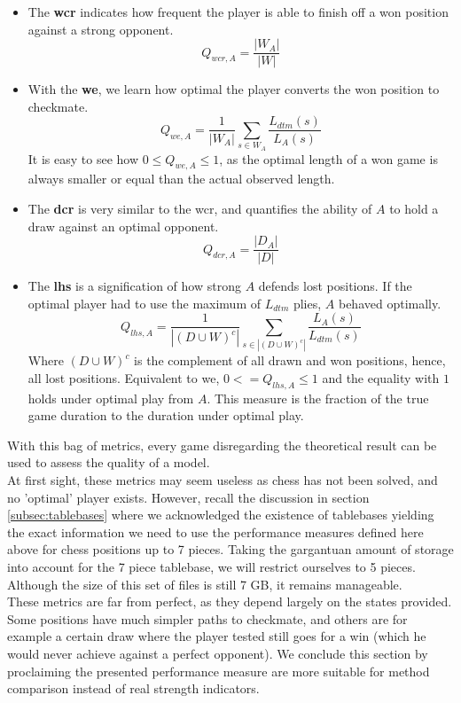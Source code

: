 \begin{itemize}
\item The \textbf{\gls{wcr}} indicates how frequent the player is able to finish off a won position against a strong opponent.
\[
Q_{wcr,A}=\frac{|W_A|}{|W|}
\] 
\item With the \textbf{\gls{we}}, we learn how optimal the player converts the won position to checkmate.
\[
Q_{we,A}=\frac{1}{|W_A|}\sum_{s\in W_A}\frac{L_{dtm}(s)}{L_A(s)}
\]
It is easy to see how $0\leq Q_{we,A}\leq1$, as the optimal length of a won game is always smaller or equal than the actual observed length.
\item The \textbf{\gls{dcr}} is very similar to the \gls{wcr}, and quantifies the ability of $A$ to hold a draw against an optimal opponent.
\[
Q_{dcr,A}=\frac{|D_A|}{|D|}
\]
\item The \textbf{\gls{lhs}} is a signification of how strong $A$ defends lost positions. If the optimal player had to use the maximum of $L_{dtm}$ plies, $A$ behaved optimally.
\[
Q_{lhs,A}=\frac{1}{\left|(D \cup W)^c\right|}\sum_{s\in \left|(D \cup W)^c\right|}\frac{L_{A}(s)}{L_{dtm}(s)}
\]
Where $(D \cup W)^c$ is the complement of all drawn and won positions, hence, all lost positions. Equivalent to \gls{we}, $0<=Q_{lhs,A}\leq1$ and the equality with $1$ holds under optimal play from $A$. This measure is the fraction of the true game duration to the duration under optimal play.
\end{itemize}

With this bag of metrics, every game disregarding the theoretical result can be used to assess the quality of a model.\\

At first sight, these metrics may seem useless as chess has not been solved, and no 'optimal' player exists. However, recall the discussion in section \ref{subsec:tablebases} where we acknowledged the existence of tablebases yielding the exact information we need to use the performance measures defined here above for chess positions up to 7 pieces. Taking the gargantuan amount of storage into account for the 7 piece tablebase, we will restrict ourselves to 5 pieces. Although the size of this set of files is still 7 GB, it remains manageable. \\

These metrics are far from perfect, as they depend largely on the states provided. Some positions have much simpler paths to checkmate, and others are for example a certain draw where the player tested still goes for a win (which he would never achieve against a perfect opponent). We conclude this section by proclaiming the presented performance measure are more suitable for method comparison instead of real strength indicators.

